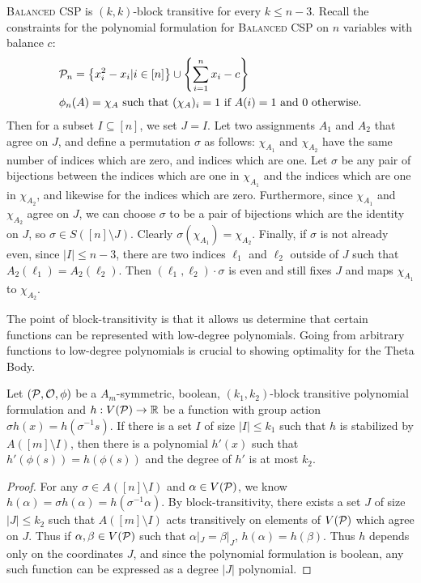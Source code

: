 \begin{example}\label{ex:bcsp-blocktransitive}
\textsc{Balanced CSP} is $(k,k)$-block transitive for every $k \leq n-3$. Recall the constraints for the polynomial formulation for \textsc{Balanced CSP} on $n$ variables with balance $c$:
\begin{align*}
&\mathcal P_n = \left\{x_i^2 - x_i | i \in [n]\right\} \cup \left\{\sum_{i=1}^n x_i - c\right\} \\
&\phi_n(A) = \chi_A \text{ such that } (\chi_A)_i = 1 \text{ if $A(i) = 1$ and $0$ otherwise.}
\end{align*}
Then for a subset $I \subseteq [n]$, we set $J = I$. Let two assignments $A_1$ and $A_2$ that agree on $J$, and define a permutation $\sigma$ as follows: $\chi_{A_1}$ and $\chi_{A_2}$ have the same number of indices which are zero, and indices which are one. Let $\sigma$ be any pair of bijections between the indices which are one in $\chi_{A_1}$ and the indices which are one in $\chi_{A_2}$, and likewise for the indices which are zero. Furthermore, since $\chi_{A_1}$ and $\chi_{A_2}$ agree on $J$, we can choose $\sigma$ to be a pair of bijections which are the identity on $J$, so $\sigma \in S([n] \setminus J)$. Clearly $\sigma(\chi_{A_1}) = \chi_{A_2}$. Finally, if $\sigma$ is not already even, since $|I| \leq n-3$, there are two indices $\ell_1$ and $\ell_2$ outside of $J$ such that $A_2(\ell_1) = A_2(\ell_2)$. Then $(\ell_1, \ell_2) \cdot \sigma$ is even and still fixes $J$ and maps $\chi_{A_1}$ to $\chi_{A_2}$.
\end{example}

The point of block-transitivity is that it allows us determine that certain functions can be represented with low-degree polynomials. Going from arbitrary functions to low-degree polynomials is crucial to showing optimality for the Theta Body.  
\begin{lemma}
Let $(\mathcal P, \mathcal O, \phi)$ be a $A_m$-symmetric, boolean, $(k_1,k_2)$-block transitive polynomial formulation and $h: V(\mathcal P) \rightarrow \mathbb R$ be a function with group action $\sigma h(x) = h(\sigma^{-1} s)$. If there is a set $I$ of size $|I| \leq k_1$ such that $h$ is stabilized by $A([m] \setminus I)$, then there is a polynomial $h'(x)$ such that $h'(\phi(s)) = h(\phi(s))$ and the degree of $h'$ is at most $k_2$. 
\end{lemma}
\begin{proof}
For any $\sigma \in A([n] \setminus I)$ and $\alpha \in V(\mathcal P)$, we know $h(\alpha) = \sigma h(\alpha) = h(\sigma^{-1} \alpha)$. By block-transitivity, there exists a set $J$ of size $|J| \leq k_2$ such that $A([m]\setminus I)$ acts transitively on elements of $V(\mathcal P)$ which agree on $J$. Thus if $\alpha,\beta \in V(\mathcal P)$ such that $\alpha|_J = \beta|_J$, $h(\alpha) = h(\beta)$. Thus $h$ depends only on the coordinates $J$, and since the polynomial formulation is boolean, any such function can be expressed as a degree $|J|$ polynomial. 
\end{proof} 

